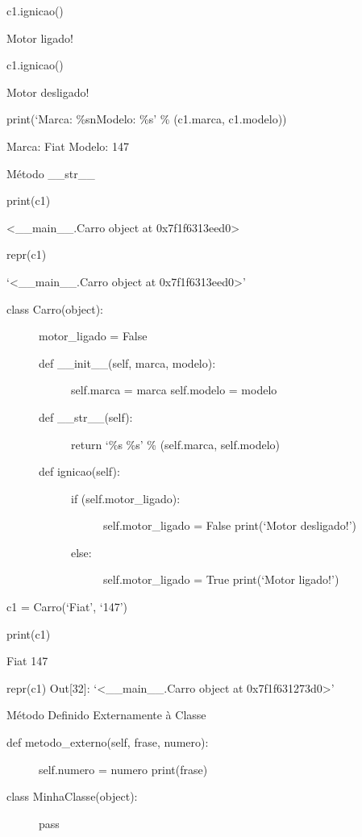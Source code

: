 \documentclass[letterpaper,10pt,brazil]{sphinxmanual}
\begin{document}
c1.ignicao()

Motor ligado!

c1.ignicao()

Motor desligado!

print(‘Marca: \%snModelo: \%s’ \% (c1.marca, c1.modelo))

Marca: Fiat
Modelo: 147

Método \_\_str\_\_

print(c1)

\textless{}\_\_main\_\_.Carro object at 0x7f1f6313eed0\textgreater{}

repr(c1)

‘\textless{}\_\_main\_\_.Carro object at 0x7f1f6313eed0\textgreater{}’
\begin{description}
\item[{class Carro(object):}] \leavevmode
motor\_ligado = False
\begin{description}
\item[{def \_\_init\_\_(self, marca, modelo):}] \leavevmode
self.marca = marca
self.modelo = modelo

\item[{def \_\_str\_\_(self):}] \leavevmode
return ‘\%s \sphinxhyphen{} \%s’ \% (self.marca, self.modelo)

\item[{def ignicao(self):}] \leavevmode\begin{description}
\item[{if (self.motor\_ligado):}] \leavevmode
self.motor\_ligado = False
print(‘Motor desligado!’)

\item[{else:}] \leavevmode
self.motor\_ligado = True
print(‘Motor ligado!’)

\end{description}

\end{description}

\end{description}

c1 = Carro(‘Fiat’, ‘147’)

print(c1)

Fiat \sphinxhyphen{} 147

repr(c1)
Out{[}32{]}: ‘\textless{}\_\_main\_\_.Carro object at 0x7f1f631273d0\textgreater{}’

Método Definido Externamente à Classe
\begin{description}
\item[{def metodo\_externo(self, frase, numero):}] \leavevmode
self.numero = numero
print(frase)

\item[{class MinhaClasse(object):}] \leavevmode
pass

\end{description}
\end{document}
